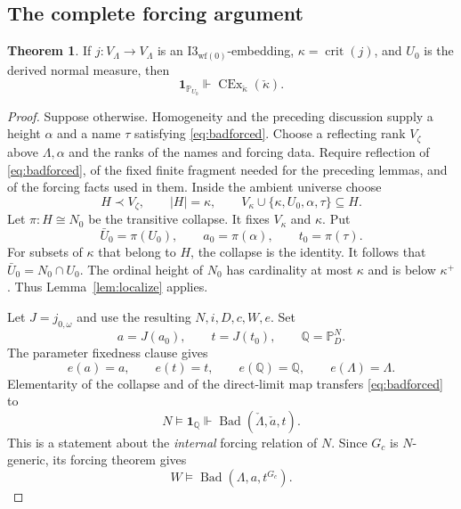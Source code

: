 \documentclass[11pt,letterpaper]{article}
\theoremstyle{definition}
\newtheorem{theorem}[definition]{Theorem}
\newcommand{\CEx}{\operatorname{CEx}}
\newcommand{\crit}{\operatorname{crit}}
\newcommand{\Iwf}{\mathrm{I3}_{\mathrm{wf}(0)}}
\newcommand{\Bad}{\operatorname{Bad}}
\newcommand{\forces}{\Vdash}
\newcommand{\PP}{\mathbb P}
\newcommand{\QQ}{\mathbb Q}
\begin{document}
\subsection{The complete forcing argument}

\begin{theorem}\label{thm:forcing}
If $j:V_\Lambda\to V_\Lambda$ is an $\Iwf$-embedding, $\kappa=\crit(j)$,
and $U_0$ is the derived normal measure, then
\begin{equation}\label{eq:forcingtheorem}
 \mathbf 1_{\PP_{U_0}}\forces\CEx_{\check\kappa}(\check\kappa).
\end{equation}
\end{theorem}

\begin{proof}
Suppose otherwise. Homogeneity and the preceding discussion supply a
height $\alpha$ and a name $\tau$ satisfying \eqref{eq:badforced}.
Choose a reflecting rank $V_\zeta$ above $\Lambda,\alpha$ and the ranks
of the names and forcing data. Require reflection of
\eqref{eq:badforced}, of the fixed finite fragment needed for the
preceding lemmas, and of the forcing facts used in them.
Inside the ambient universe choose
\[
 H\prec V_\zeta,\qquad |H|=\kappa,\qquad
 V_\kappa\cup\{\kappa,U_0,\alpha,\tau\}\subseteq H.
\]
Let $\pi:H\cong N_0$ be the transitive collapse. It fixes $V_\kappa$
and $\kappa$. Put
\[
 \bar U_0=\pi(U_0),\qquad a_0=\pi(\alpha),\qquad t_0=\pi(\tau).
\]
For subsets of $\kappa$ that belong to $H$, the collapse is the identity.
It follows that $\bar U_0=N_0\cap U_0$. The ordinal height of $N_0$
has cardinality at most $\kappa$ and is below $\kappa^+$.
Thus Lemma~\ref{lem:localize} applies.

Let $J=j_{0,\omega}$ and use the resulting $N,i,D,c,W,e$.
Set
\[
 a=J(a_0),\qquad t=J(t_0),\qquad \QQ=\PP_D^N.
\]
The parameter fixedness clause gives
\begin{equation}\label{eq:fixedparameters}
 e(a)=a,\qquad e(t)=t,\qquad e(\QQ)=\QQ,\qquad e(\Lambda)=\Lambda.
\end{equation}
Elementarity of the collapse and of the direct-limit map transfers
\eqref{eq:badforced} to
\[
 N\models \mathbf 1_{\QQ}\forces\Bad(\check\Lambda,\check a,t).
\]
This is a statement about the \emph{internal} forcing relation of $N$.
Since $G_c$ is $N$-generic, its forcing theorem gives
\begin{equation}\label{eq:badinw}
 W\models\Bad(\Lambda,a,t^{G_c}).
\end{equation}


\end{proof}
\end{document}
